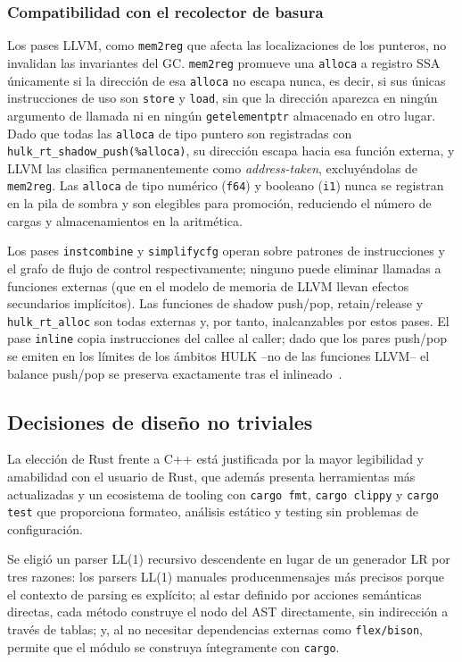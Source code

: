 \documentclass[12pt, a4paper]{article}
\begin{document}
\subsubsection{Compatibilidad con el recolector de basura}

Los pases LLVM, como \texttt{mem2reg} que afecta las localizaciones de los punteros, no 
invalidan las invariantes del GC. \texttt{mem2reg} promueve una \texttt{alloca} a 
registro SSA únicamente si la dirección de esa \texttt{alloca} no escapa nunca, 
es decir, si sus únicas instrucciones de uso son \texttt{store} y \texttt{load}, 
sin que la dirección aparezca en ningún argumento de llamada ni en ningún \texttt{getelementptr}
almacenado en otro lugar. Dado que todas las \texttt{alloca} de tipo puntero
son registradas con \texttt{hulk\_rt\_shadow\_push(\%alloca)}, su dirección
escapa hacia esa función externa, y LLVM las clasifica permanentemente como
\textit{address-taken}, excluyéndolas de \texttt{mem2reg}. Las \texttt{alloca}
de tipo numérico (\texttt{f64}) y booleano (\texttt{i1}) nunca se registran en
la pila de sombra y son elegibles para promoción, reduciendo el número de cargas
y almacenamientos en la aritmética.

Los pases \texttt{instcombine} y \texttt{simplifycfg} operan sobre patrones de
instrucciones y el grafo de flujo de control respectivamente; ninguno puede
eliminar llamadas a funciones externas (que en el modelo de memoria de LLVM
llevan efectos secundarios implícitos). Las funciones de shadow push/pop,
retain/release y \texttt{hulk\_rt\_alloc} son todas externas y, por tanto,
inalcanzables por estos pases. El pase \texttt{inline} copia instrucciones del
callee al caller; dado que los pares push/pop se emiten en los límites de los
ámbitos HULK --no de las funciones LLVM-- el balance push/pop se preserva
exactamente tras el inlineado~\cite{allen2001}.

\subsection{Decisiones de dise\~{n}o no triviales}

La elecci\'{o}n de Rust frente a C++ est\'{a} justificada por la mayor legibilidad y amabilidad con el usuario de Rust, que además presenta herramientas más actualizadas y un ecosistema de tooling con \texttt{cargo fmt}, \texttt{cargo clippy} y \texttt{cargo test} que proporciona formateo, an\'{a}lisis est\'{a}tico y testing sin problemas de configuraci\'{o}n.

Se eligi\'{o} un parser LL(1) recursivo descendente en lugar de un generador LR por tres razones: los parsers LL(1) manuales producenmensajes m\'{a}s precisos porque el contexto de parsing es expl\'{i}cito; al estar definido por acciones sem\'{a}nticas directas, cada m\'{e}todo construye el nodo del AST directamente, sin indirecci\'{o}n a trav\'{e}s de tablas; y, al no necesitar dependencias externas como \texttt{flex/bison}, permite que el módulo se construya \'{i}ntegramente con \texttt{cargo}.
\end{document}
